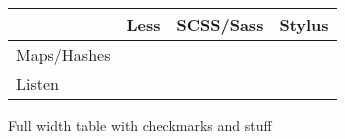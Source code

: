 \documentclass[a4paper]{article}
\newcommand{\cmark}{\ding{51}}%
\newcommand{\xmark}{\ding{55}}%
\begin{document}
\begin{figure}[hct!]
  \caption{Full width table with checkmarks and stuff}
  \begin{center}
    \begin{tabular}{ | l | l | l | p{5cm} |}
      \hline
       & Less & SCSS/Sass & Stylus \\ \hline
      Maps/Hashes & \xmark & \cmark\footnotemark  & \cmark\footnotemark \\ \hline
      Listen & \xmark & \cmark\footnotemark  & \cmark\footnotemark \\ \hline
    \end{tabular}
  \end{center}

  \label{fig:fig1}
\end{figure}

\addtocounter{footnote}{-4}
\end{document}
